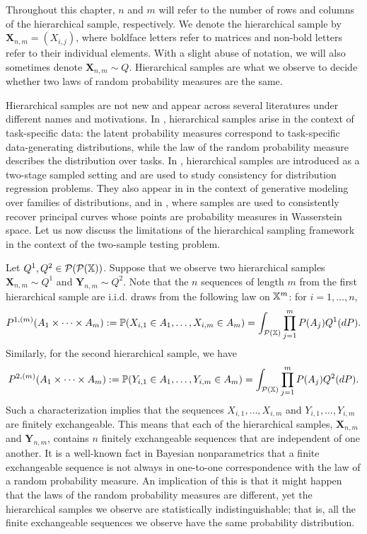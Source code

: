 Throughout this chapter, $n$ and $m$ will refer to the number of rows and columns of the hierarchical sample, respectively. We denote the hierarchical sample by $\mathbf{X}_{n,m} = (X_{i,j})$, where boldface letters refer to matrices and non-bold letters refer to their individual elements. With a slight abuse of notation, we will also sometimes denote $\mathbf{X}_{n,m} \sim Q$. Hierarchical samples are what we observe to decide whether two laws of random probability measures are the same. 

Hierarchical samples are not new and appear across several literatures under different names and motivations. In \citet{Baxter2000}, hierarchical samples arise in the context of task-specific data: the latent probability measures correspond to task-specific data-generating distributions, while the law of the random probability measure describes the distribution over tasks. In \citet{Szabo2016}, hierarchical samples are introduced as a two-stage sampled setting and are used to study consistency for distribution regression problems. They also appear in \citet{Haviv2024} in the context of generative modeling over families of distributions, and in \citet{Warren2025}, where samples are used to consistently recover principal curves whose points are probability measures in Wasserstein space. Let us now discuss the limitations of the hierarchical sampling framework in the context of the two-sample testing problem.

Let $Q^1, Q^2 \in \mathcal{P}(\mathcal{P}(\mathbb{X}))$. Suppose that we observe two hierarchical samples $\mathbf{X}_{n,m} \sim Q^1$ and $\mathbf{Y}_{n,m} \sim Q^2$. Note that the $n$ sequences of length $m$ from the first hierarchical sample are i.i.d. draws from the following law on $\mathbb{X}^m$: for $i = 1, \dots, n$,
$$
P^{1,(m)}(A_1 \times \cdots \times A_m) := \mathbb{P}(X_{i,1} \in A_1, \dots, X_{i,m} \in A_m) = \int_{\mathcal{P}(\mathbb{X})} \prod_{j=1}^m P(A_j) Q^1(dP).
$$
Similarly, for the second hierarchical sample, we have
$$
P^{2,(m)}(A_1 \times \cdots \times A_m) := \mathbb{P}(Y_{i,1} \in A_1, \dots, Y_{i,m} \in A_m) = \int_{\mathcal{P}(\mathbb{X})} \prod_{j=1}^m P(A_j) Q^2(dP).
$$
Such a characterization implies that the sequences $X_{i,1}, \dots, X_{i,m}$ and $Y_{i,1}, \dots, Y_{i,m}$ are finitely exchangeable. This means that each of the hierarchical samples, $\mathbf{X}_{n,m}$ and $\mathbf{Y}_{n,m}$, contains $n$ finitely exchangeable sequences that are independent of one another. It is a well-known fact in Bayesian nonparametrics that a finite exchangeable sequence is not always in one-to-one correspondence with the law of a random probability measure. An implication of this is that it might happen that the laws of the random probability measures are different, yet the hierarchical samples we observe are statistically indistinguishable; that is, all the finite exchangeable sequences we observe have the same probability distribution.

